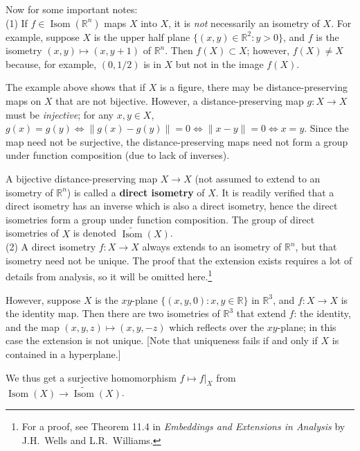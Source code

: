 \documentclass[leqno]{book}
\begin{document}
Now for some important notes:\\

\noindent(1) If $f\in\operatorname{Isom}(\mathbb R^n)$ maps $X$ into $X$, it is \emph{not} necessarily an isometry of $X$.  For example, suppose $X$ is the upper half plane $\{(x,y)\in\mathbb R^2:y>0\}$, and $f$ is the isometry $(x,y)\mapsto(x,y+1)$ of $\mathbb R^n$.  Then $f(X)\subset X$; however, $f(X)\ne X$ because, for example, $(0,1/2)$ is in $X$ but not in the image $f(X)$.

The example above shows that if $X$ is a figure, there may be distance-preserving maps on $X$ that are not bijective.  However, a distance-preserving map $g:X\to X$ must be \emph{injective}; for any $x,y\in X$, $g(x)=g(y)\iff\|g(x)-g(y)\|=0\iff\|x-y\|=0\iff x=y$.  Since the map need not be surjective, the distance-preserving maps need not form a group under function composition (due to lack of inverses).

A bijective distance-preserving map $X\to X$ (not assumed to extend to an isometry of $\mathbb R^n$) is called a \textbf{direct isometry} of $X$.  It is readily verified that a direct isometry has an inverse which is also a direct isometry, hence the direct isometries form a group under function composition.  The group of direct isometries of $X$ is denoted $\widetilde{\operatorname{Isom}}(X)$.\\

\noindent(2) A direct isometry $f:X\to X$ always extends to an isometry of $\mathbb R^n$, but that isometry need not be unique.  The proof that the extension exists requires a lot of details from analysis, so it will be omitted here.\footnote{For a proof, see Theorem 11.4 in \emph{Embeddings and Extensions in Analysis} by J.H.~Wells and L.R.~Williams.} %

However, suppose $X$ is the $xy$-plane $\{(x,y,0):x,y\in\mathbb R\}$ in $\mathbb R^3$, and $f:X\to X$ is the identity map.  Then there are two isometries of $\mathbb R^3$ that extend $f$: the identity, and the map $(x,y,z)\mapsto(x,y,-z)$ which reflects over the $xy$-plane; in this case the extension is not unique.  [Note that uniqueness fails if and only if $X$ is contained in a hyperplane.]

We thus get a surjective homomorphism $f\mapsto f|_X$ from $\operatorname{Isom}(X)\to\widetilde{\operatorname{Isom}}(X)$.\\
\end{document}
